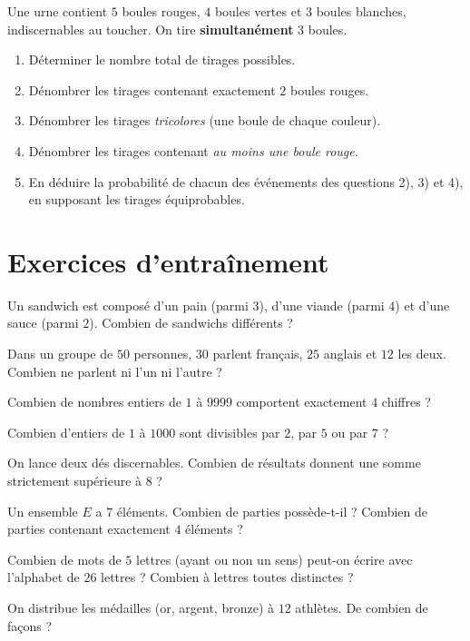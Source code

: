 \exo{} Une urne contient $5$ boules rouges, $4$ boules vertes et $3$ boules blanches, indiscernables au toucher. On tire \textbf{simultanément} $3$ boules.
\begin{enumerate}[label=\arabic*)]
\item Déterminer le nombre total de tirages possibles.
\item Dénombrer les tirages contenant exactement $2$ boules rouges.
\item Dénombrer les tirages \emph{tricolores} (une boule de chaque couleur).
\item Dénombrer les tirages contenant \emph{au moins une boule rouge}.
\item En déduire la probabilité de chacun des événements des questions 2), 3) et 4), en supposant les tirages équiprobables.
\end{enumerate}

\section{Exercices d'entraînement}

\exo{} Un sandwich est composé d'un pain (parmi $3$), d'une viande (parmi $4$) et
d'une sauce (parmi $2$). Combien de sandwichs différents ?

\exo{} Dans un groupe de $50$ personnes, $30$ parlent français, $25$ anglais et
$12$ les deux. Combien ne parlent ni l'un ni l'autre ?

\exo{} Combien de nombres entiers de $1$ à $9999$ comportent exactement $4$ chiffres ?

\exo{} Combien d'entiers de $1$ à $1000$ sont divisibles par $2$, par $5$ ou par $7$ ?

\exo{} On lance deux dés discernables. Combien de résultats donnent une somme
strictement supérieure à $8$ ?

\exo{} Un ensemble $E$ a $7$ éléments. Combien de parties possède-t-il ? Combien
de parties contenant exactement $4$ éléments ?

\exo{} Combien de mots de $5$ lettres (ayant ou non un sens) peut-on écrire avec
l'alphabet de $26$ lettres ? Combien à lettres toutes distinctes ?

\exo{} On distribue les médailles (or, argent, bronze) à $12$ athlètes. De combien
de façons ?

